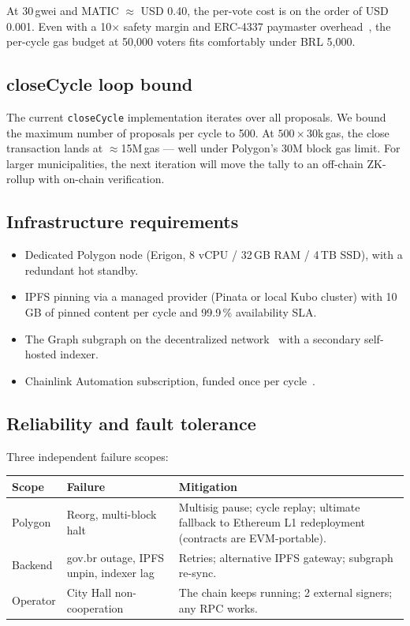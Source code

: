 \documentclass[12pt]{article}
\begin{document}
At 30\,gwei and MATIC \(\approx\) USD 0.40, the per-vote cost is on the
order of USD 0.001. Even with a 10\(\times\) safety margin and ERC-4337
paymaster overhead~\cite{eip4337}, the per-cycle gas budget at 50{,}000
voters fits comfortably under BRL 5{,}000.

\subsection{closeCycle loop bound}

The current \texttt{closeCycle} implementation iterates over all proposals.
We bound the maximum number of proposals per cycle to 500. At
\(500 \times 30\)k\,gas, the close transaction lands at \(\approx\)15M\,gas
--- well under Polygon's 30M block gas limit. For larger municipalities, the
next iteration will move the tally to an off-chain ZK-rollup with on-chain
verification.

\subsection{Infrastructure requirements}

\begin{itemize}
  \item Dedicated Polygon node (Erigon, 8 vCPU / 32\,GB RAM / 4\,TB SSD), with
        a redundant hot standby.
  \item IPFS pinning via a managed provider (Pinata or local Kubo cluster)
        with 10\,GB of pinned content per cycle and 99.9\,\% availability SLA.
  \item The Graph subgraph on the decentralized
        network~\cite{thegraphdocs} with a secondary self-hosted indexer.
  \item Chainlink Automation subscription, funded once per
        cycle~\cite{chainlinkautomation}.
\end{itemize}

\subsection{Reliability and fault tolerance}

Three independent failure scopes:

\noindent\begin{tabular}{l p{} p{}}
\toprule
\textbf{Scope} & \textbf{Failure} & \textbf{Mitigation} \\
\midrule
Polygon & Reorg, multi-block halt & Multisig pause; cycle replay; ultimate fallback to Ethereum L1 redeployment (contracts are EVM-portable). \\
Backend & gov.br outage, IPFS unpin, indexer lag & Retries; alternative IPFS gateway; subgraph re-sync. \\
Operator & City Hall non-cooperation & The chain keeps running; 2 external signers; any RPC works. \\
\bottomrule
\end{tabular}
\end{document}

